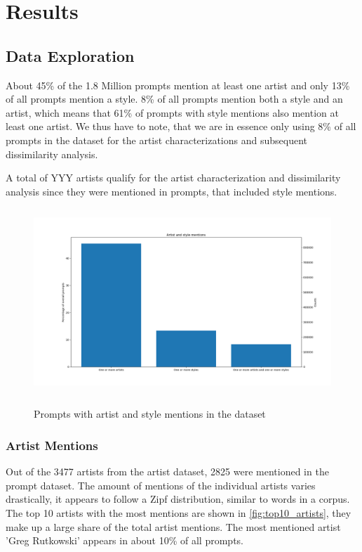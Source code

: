 \chapter{Results}
\label{cha:Results}


\section{Data Exploration}

About 45\% of the 1.8 Million prompts mention at least one artist and only 13\% of all prompts mention a style. 8\% of all prompts mention both a style and an artist, which means that 61\% of prompts with style mentions also mention at least one artist. We thus have to note, that we are in essence only using 8\% of all prompts in the dataset for the artist characterizations and subsequent dissimilarity analysis.

A total of YYY artists qualify for the artist characterization and dissimilarity analysis since they were mentioned in prompts, that included style mentions.

\begin{figure}[h]
    \begin{center}
        \includegraphics[height=7cm]{Bilder/artist_and_style_mentions.png}\\[2.5ex]
    \end{center}
\caption{Prompts with artist and style mentions in the dataset}
\end{figure}

\subsection{Artist Mentions}

Out of the 3477 artists from the artist dataset, 2825 were mentioned in the prompt dataset. The amount of mentions of the individual artists varies drastically, it appears to follow a Zipf distribution, similar to words in a corpus. The top 10 artists with the most mentions are shown in \ref{fig:top10_artists}, they make up a large share of the total artist mentions. The most mentioned artist 'Greg Rutkowski' appears in about 10\% of all prompts.

